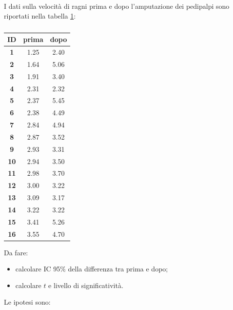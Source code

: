 \documentclass[10pt, draft]{book}
\newcommand{\tightlist}{%
\setlength{\itemsep}{1pt}\setlength{\parskip}{0pt}\setlength{\parsep}{0pt}}
\newcounter{example}[section]
\begin{document}
\begin{example}\label{esamputazione}
    I dati sulla velocità di ragni prima e dopo l'amputazione dei pedipalpi sono riportati nella tabella \ref{tabamputazione}:
    \begin{table}[H]
        \centering
        \renewcommand\arraystretch{1.2}
        \begin{tabular}{c|c|c}
        \hline
        \textbf{ID} & \textbf{prima} & \textbf{dopo}\\ 
        \hline
        \textbf{1} & 1.25 & 2.40\\
        \hline
        \textbf{2} & 1.64 & 5.06\\
        \hline
        \textbf{3} & 1.91 & 3.40\\
        \hline
        \textbf{4} & 2.31 & 2.32\\
        \hline
        \textbf{5} & 2.37 & 5.45\\
        \hline
        \textbf{6} & 2.38 & 4.49\\
        \hline
        \textbf{7} & 2.84 & 4.94\\
        \hline
        \textbf{8} & 2.87 & 3.52\\
        \hline
        \textbf{9} & 2.93 & 3.31\\
        \hline
        \textbf{10} & 2.94 & 3.50\\
        \hline
        \textbf{11} & 2.98 & 3.70\\
        \hline
        \textbf{12} & 3.00 & 3.22\\
        \hline
        \textbf{13} & 3.09 & 3.17\\
        \hline
        \textbf{14} & 3.22 & 3.22\\
        \hline
        \textbf{15} & 3.41 & 5.26\\
        \hline
        \textbf{16} & 3.55 & 4.70\\
        \hline
        \end{tabular}
        \caption{\small{}}
        \label{tabamputazione}
    \end{table}\noindent
    Da fare:
    \begin{itemize} \tightlist
        \item calcolare IC 95\% della differenza tra prima e dopo;
        \item calcolare $t$ e livello di significatività.
    \end{itemize}
    Le ipotesi sono:
    \begin{itemize} \tightlist

\end{itemize}
\end{example}
\end{document}
